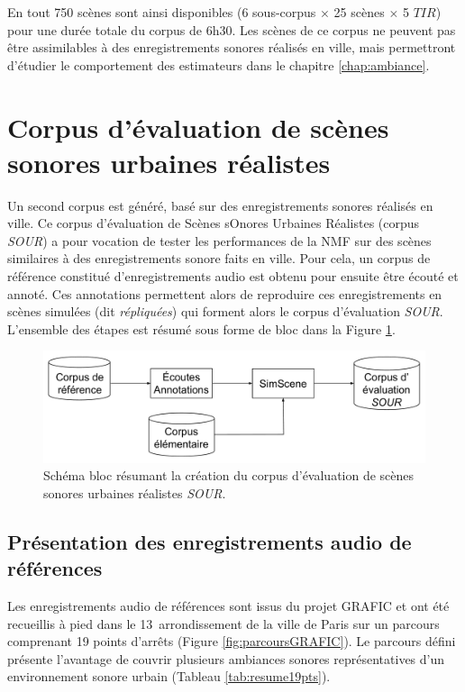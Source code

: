En tout 750 scènes sont ainsi disponibles (6 sous-corpus $\times$ 25 scènes $\times$ 5 $TIR$) pour une durée totale du corpus de 6h30. Les scènes de ce corpus ne peuvent pas être assimilables à des enregistrements sonores réalisés en ville, mais permettront d'étudier le comportement des estimateurs dans le chapitre \ref{chap:ambiance}. 

\section{Corpus d'évaluation de scènes sonores urbaines réalistes}
\label{part:corpus_grafic}

Un second corpus est généré, basé sur des enregistrements sonores réalisés en ville. Ce corpus d'évaluation de Scènes sOnores Urbaines Réalistes (corpus \textit{SOUR}) a pour vocation de tester les performances de la NMF sur des scènes similaires à des enregistrements sonore faits en ville. Pour cela, un corpus de référence constitué d'enregistrements audio est obtenu pour ensuite être écouté et annoté. Ces annotations permettent alors de reproduire ces enregistrements en scènes simulées (dit \textit{répliquées}) qui forment alors le corpus d'évaluation \textit{SOUR}. L'ensemble des étapes est résumé sous forme de bloc dans la Figure \ref{fig:bloc_diagram_annotation}.

\begin{figure}[ht]
\centering
\includegraphics[width=.7\textwidth]{./figures/autres/bloc_diagram_annotation.pdf}
\caption{Schéma bloc résumant la création du corpus d'évaluation de scènes sonores urbaines réalistes \textit{SOUR}.}
\label{fig:bloc_diagram_annotation}
\end{figure}

\subsection{Présentation des enregistrements audio de références}

Les enregistrements audio de références sont issus du projet GRAFIC \cite{aumond2017modeling} et ont été recueillis à pied dans le 13\ieme~arrondissement de la ville de Paris sur un parcours comprenant 19 points d'arrêts (Figure \ref{fig:parcoursGRAFIC}). Le parcours défini présente l'avantage de couvrir plusieurs ambiances sonores représentatives d'un environnement sonore urbain (Tableau \ref{tab:resume19pts}).\\

